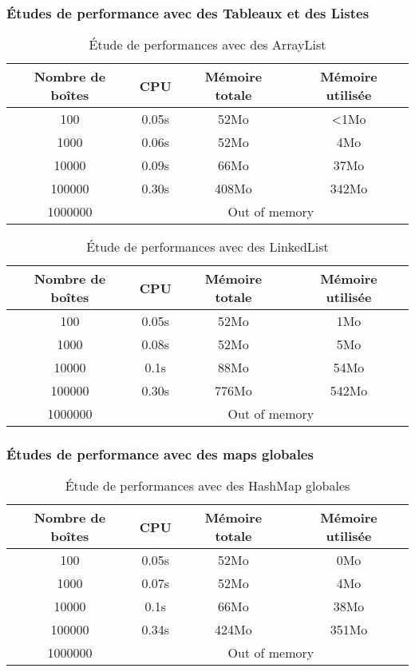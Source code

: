 \clearpage
\subsubsection{Études de performance avec des Tableaux et des Listes}

\begin{table}[h]
  \centering
\begin{tabular}{|c|c|c|c|}
\hline
Nombre de boîtes & CPU & Mémoire totale & Mémoire utilisée\\
\hline
100 & 0.05s & 52Mo & <1Mo\\
\hline
1000 & 0.06s & 52Mo & 4Mo\\
\hline
10000 & 0.09s & 66Mo & 37Mo\\
\hline
100000 & 0.30s & 408Mo & 342Mo\\
\hline
1000000 & \multicolumn{3}{|c|}{Out of memory}\\
\hline
\end{tabular}
\caption{Étude de performances avec des ArrayList}
 \label{tab:arraylist}
\end{table}

\begin{table}[h]
  \centering
\begin{tabular}{|c|c|c|c|}
\hline
Nombre de boîtes & CPU & Mémoire totale & Mémoire utilisée\\
\hline
100 & 0.05s & 52Mo & 1Mo\\
\hline
1000 & 0.08s & 52Mo & 5Mo\\
\hline
10000 & 0.1s & 88Mo & 54Mo\\
\hline
100000 & 0.30s & 776Mo & 542Mo\\
\hline
1000000 & \multicolumn{3}{|c|}{Out of memory}\\
\hline
\end{tabular}
\caption{Étude de performances avec des LinkedList}
\label{tab:linkedlist}
\end{table}




\clearpage
\subsubsection{Études de performance avec des maps globales}
\begin{table}[h]
  \centering
\begin{tabular}{|c|c|c|c|}
\hline
Nombre de boîtes & CPU & Mémoire totale & Mémoire utilisée\\
\hline
100 & 0.05s & 52Mo & 0Mo\\
\hline
1000 & 0.07s & 52Mo & 4Mo\\
\hline
10000 & 0.1s & 66Mo & 38Mo\\
\hline
100000 & 0.34s & 424Mo & 351Mo\\
\hline
1000000 & \multicolumn{3}{|c|}{Out of memory}\\
\hline
\end{tabular}
\caption{Étude de performances avec des HashMap globales} 
\label{tab:hashmapglobal}
\end{table}


